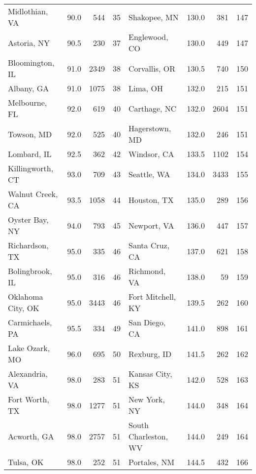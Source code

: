 \begin{longtable}{lrrr|lrrr}
Midlothian, VA       &    90.0 &    544 &    35 & Shakopee, MN         &   130.0 &    381 &   147 \\
Astoria, NY          &    90.5 &    230 &    37 & Englewood, CO        &   130.0 &    449 &   147 \\
Bloomington, IL      &    91.0 &   2349 &    38 & Corvallis, OR        &   130.5 &    740 &   150 \\
Albany, GA           &    91.0 &   1075 &    38 & Lima, OH             &   132.0 &    215 &   151 \\
Melbourne, FL        &    92.0 &    619 &    40 & Carthage, NC         &   132.0 &   2604 &   151 \\
Towson, MD           &    92.0 &    525 &    40 & Hagerstown, MD       &   132.0 &    246 &   151 \\
Lombard, IL          &    92.5 &    362 &    42 & Windsor, CA          &   133.5 &   1102 &   154 \\
Killingworth, CT     &    93.0 &    709 &    43 & Seattle, WA          &   134.0 &   3433 &   155 \\
Walnut Creek, CA     &    93.5 &   1058 &    44 & Houston, TX          &   135.0 &    289 &   156 \\
Oyster Bay, NY       &    94.0 &    793 &    45 & Newport, VA          &   136.0 &    447 &   157 \\
Richardson, TX       &    95.0 &    335 &    46 & Santa Cruz, CA       &   137.0 &    621 &   158 \\
Bolingbrook, IL      &    95.0 &    316 &    46 & Richmond, VA         &   138.0 &     59 &   159 \\
Oklahoma City, OK    &    95.0 &   3443 &    46 & Fort Mitchell, KY    &   139.5 &    262 &   160 \\
Carmichaels, PA      &    95.5 &    334 &    49 & San Diego, CA        &   141.0 &    898 &   161 \\
Lake Ozark, MO       &    96.0 &    695 &    50 & Rexburg, ID          &   141.5 &    262 &   162 \\
Alexandria, VA       &    98.0 &    283 &    51 & Kansas City, KS      &   142.0 &    528 &   163 \\
Fort Worth, TX       &    98.0 &   1277 &    51 & New York, NY         &   144.0 &    348 &   164 \\
Acworth, GA          &    98.0 &   2757 &    51 & South Charleston, WV &   144.0 &    249 &   164 \\
Tulsa, OK            &    98.0 &    252 &    51 & Portales, NM         &   144.5 &    432 &   166 \\

\end{longtable}
